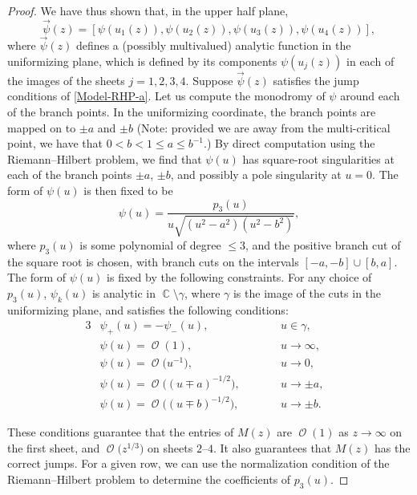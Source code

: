 \documentclass[pdftex]{sigma}
\DeclareMathOperator{\CC}{\mathbb{C}}
\DeclareMathOperator{\OO}{\mathcal{O}}
\numberwithin{equation}{section}
\begin{document}
\begin{proof}
We have thus shown that, in the upper half plane,
 \begin{equation*}
 \vec{\psi}(z) = [\psi(u_1(z)), \psi(u_2(z)), \psi(u_3(z)), \psi(u_4(z)) ],
 \end{equation*}
where $\vec{\psi}(z)$ defines a (possibly multivalued) analytic function in the uniformizing plane, which is defined by its components $\psi(u_j(z))$ in each of the images of the sheets $j = 1,2,3,4$. Suppose $\vec{\psi}(z)$ satisfies the jump conditions of \eqref{Model-RHP-a}.
Let us compute the monodromy of $\psi$ around each of the branch points. In the uniformizing coordinate, the branch points are mapped on
to $\pm a$ and $\pm b$ \big(Note: provided we are away from the multi-critical point, we have that $0 < b < 1 \leq a \leq b^{-1}$.\big) By direct computation using the Riemann--Hilbert problem, we find that $\psi(u)$ has square-root singularities at each of the branch points $\pm a$, $\pm b$,
and possibly a pole singularity at $u=0$. The form of $\psi(u)$ is then fixed to be
 \begin{equation*}
 \psi(u) = \frac{p_3(u)}{u\sqrt{(u^2-a^2)(u^2-b^2)}},
 \end{equation*}
where $p_3(u)$ is some polynomial of degree $\leq 3$, and the positive branch cut of the square root is chosen, with branch cuts on the intervals $[-a,-b]\cup [b,a]$.
The form of $\psi(u)$ is fixed by the following constraints. For any choice of $p_3(u)$, $\psi_k(u)$ is analytic in $\CC \setminus \gamma$, where $\gamma$ is the image of the cuts in the uniformizing plane, and satisfies the following conditions:
\begin{alignat*}{3}
 &\psi_+(u) = -\psi_-(u),\qquad&& u \in \gamma,&\\
 &\psi(u) = \OO(1),\qquad&& u \to \infty,&\\
 &\psi(u) = \OO\bigl(u^{-1}\bigr),\qquad&& u \to 0,&\\
 &\psi(u) = \OO\bigl( (u\mp a)^{-1/2}\bigr),\qquad&& u \to \pm a,&\\
 &\psi(u) = \OO\bigl( (u\mp b)^{-1/2}\bigr),\qquad&& u \to \pm b.&
\end{alignat*}

These conditions guarantee that the entries of $M(z)$ are $\OO(1)$ as $z\to \infty$ on the first sheet, and $\OO\bigl(z^{1/3}\bigr)$ on sheets $2$--$4$. It also guarantees that $M(z)$ has the correct jumps.
For a given row, we can use the normalization condition of the Riemann--Hilbert problem to determine the coefficients of $p_3(u)$.


\end{proof}
\end{document}
